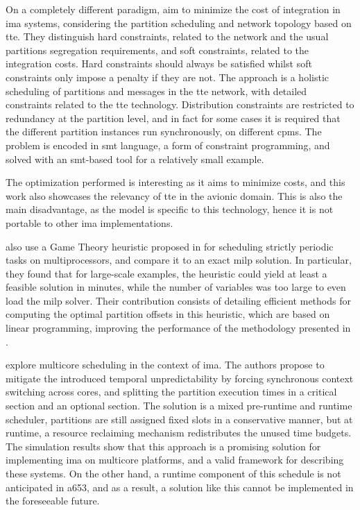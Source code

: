 \documentclass[main.tex]{subfiles}
\begin{document}
On a completely different paradigm, \textcite{beji2014smt} aim to minimize the cost of integration in \gls{ima} systems, considering the partition scheduling and network topology based on \gls{tte}.
They distinguish hard constraints, related to the network and the usual partitions segregation requirements, and soft constraints, related to the integration costs.
Hard constraints should always be satisfied whilst soft constraints only impose a penalty if they are not.
The approach is a holistic scheduling of partitions and messages in the \gls{tte} network, with detailed constraints related to the \gls{tte} technology.
Distribution constraints are restricted to redundancy at the partition level, and in fact for some cases it is required that the different partition instances run synchronously, on different \glspl{cpm}.
The problem is encoded in \gls{smt} language, a form of constraint programming, and solved with an \gls{smt}-based tool for a relatively small example.

The optimization performed is interesting as it aims to minimize costs, and this work also showcases the relevancy of \gls{tte} in the avionic domain.
This is also the main disadvantage, as the model is specific to this technology, hence it is not portable to other \gls{ima} implementations.

\Textcite{pira2016line} also use a Game Theory heuristic proposed in \cite{al2012strictly} for scheduling strictly periodic tasks on multiprocessors, and compare it to an exact \gls{milp} solution.
In particular, they found that for large-scale examples, the heuristic could yield at least a feasible solution in minutes, while the number of variables was too large to even load the \gls{milp} solver.
Their contribution consists of detailing efficient methods for computing the optimal partition offsets in this heuristic, which are based on linear programming, improving the performance of the methodology presented in \textcite{al2012strictly}.

\Textcite{melani2017scheduling} explore multicore scheduling in the context of \gls{ima}.
The authors propose to mitigate the introduced temporal unpredictability by forcing synchronous context switching across cores, and splitting the partition execution times in a critical section and an optional section.
The solution is a mixed pre-runtime and runtime scheduler, partitions are still assigned fixed slots in a conservative manner, but at runtime, a resource reclaiming mechanism redistributes the unused time budgets.
The simulation results show that this approach is a promising solution for implementing \gls{ima} on multicore platforms, and a valid framework for describing these systems.
On the other hand, a runtime component of this schedule is not anticipated in \gls{a653}, and as a result, a solution like this cannot be implemented in the foreseeable future.
\end{document}
